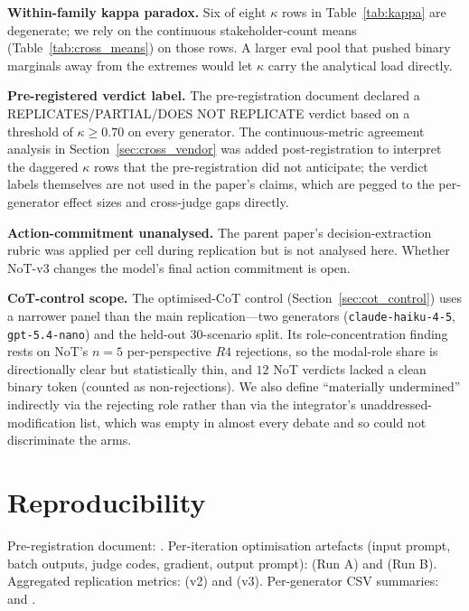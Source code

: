 \documentclass[11pt]{article}
\begin{document}
\textbf{Within-family kappa paradox.}
Six of eight $\kappa$ rows in Table~\ref{tab:kappa} are degenerate; we rely on the continuous stakeholder-count means (Table~\ref{tab:cross_means}) on those rows.
A larger eval pool that pushed binary marginals away from the extremes would let $\kappa$ carry the analytical load directly.

\textbf{Pre-registered verdict label.}
The pre-registration document declared a REPLICATES/PARTIAL/DOES NOT REPLICATE verdict based on a threshold of $\kappa \geq 0.70$ on every generator.
The continuous-metric agreement analysis in Section~\ref{sec:cross_vendor} was added post-registration to interpret the daggered $\kappa$ rows that the pre-registration did not anticipate; the verdict labels themselves are not used in the paper's claims, which are pegged to the per-generator effect sizes and cross-judge gaps directly.

\textbf{Action-commitment unanalysed.}
The parent paper's decision-extraction rubric was applied per cell during replication but is not analysed here.
Whether NoT-v3 changes the model's final action commitment is open.

\textbf{CoT-control scope.}
The optimised-CoT control (Section~\ref{sec:cot_control}) uses a narrower panel than the main replication---two generators (\texttt{claude-haiku-4-5}, \texttt{gpt-5.4-nano}) and the held-out $30$-scenario split.
Its role-concentration finding rests on NoT's $n = 5$ per-perspective $R4$ rejections, so the modal-role share is directionally clear but statistically thin, and $12$ NoT verdicts lacked a clean binary token (counted as non-rejections).
We also define ``materially undermined'' indirectly via the rejecting role rather than via the integrator's unaddressed-modification list, which was empty in almost every debate and so could not discriminate the arms.



\appendix

\section{Reproducibility}
\label{app:repro}

{\sloppy
Pre-registration document: .
Per-iteration optimisation artefacts (input prompt, batch outputs, judge codes, gradient, output prompt):  (Run A) and  (Run B).
Aggregated replication metrics:  (v2) and  (v3).
Per-generator CSV summaries:  and .
\par}
\end{document}
